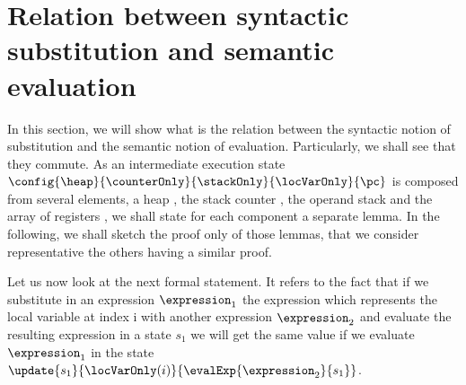 \newtheorem{substHeap}{Lemma}[section]
\newtheorem{newHeap}[substHeap]{Lemma}
\newtheorem{substStack}[substHeap]{Lemma}
\newtheorem{substCntr}[substHeap]{Lemma}
\newtheorem{substLv}[substHeap]{Lemma}
\newtheorem{substRet}[substHeap]{Lemma}
\newtheorem{substOld}[substHeap]{Lemma}

\newtheorem{valid}{Definition}[section]

\section{Relation between syntactic substitution and semantic evaluation}\label{substProp}

In this section, we will show what is the relation between the syntactic notion
of substitution and the semantic notion of evaluation. Particularly, we shall see that they commute.
As an intermediate execution state $ \config{\heap}{\counterOnly}{ \stackOnly }{\locVarOnly}{\pc } $ 
is composed from several elements, a heap \heap{}, the stack counter \counterOnly, the operand stack \stackOnly{} 
and the array of registers \locVarOnly, we shall state for each component a separate lemma.
In the following, we shall sketch the proof only of those lemmas, that we consider representative  the others having a similar proof. 

Let us now look at the next formal statement.
It refers to the fact that if we substitute in an expression $\expression_1$ 
the expression   which represents the local variable at index i
 with another expression $\expression_2$ and evaluate the resulting expression in a state $s_1$
 we will get the same value if we evaluate   $\expression_1$  in the state 
$\update{s_1}{\locVarOnly(i) }{ \evalExp{ \expression_2 }{s_1}  }$.


